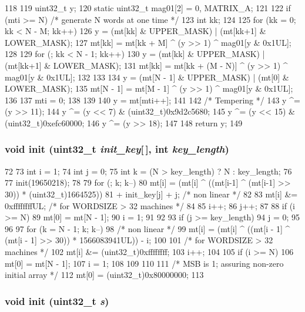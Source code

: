 \begin{DoxyCode}
118 {
119     uint32_t y;
120     static uint32_t mag01[2] = { 0, MATRIX_A};
121 
122     if (mti >= N) { /* generate N words at one time */
123         int kk;
124 
125         for (kk = 0; kk < N - M; kk++) {
126             y = (mt[kk] & UPPER_MASK) | (mt[kk+1] & LOWER_MASK);
127             mt[kk] = mt[kk + M] ^ (y >> 1) ^ mag01[y & 0x1UL];
128         }
129         for (; kk < N - 1; kk++) {
130             y = (mt[kk] & UPPER_MASK) | (mt[kk+1] & LOWER_MASK);
131             mt[kk] = mt[kk + (M - N)] ^ (y >> 1) ^ mag01[y & 0x1UL];
132         }
133 
134         y = (mt[N - 1] & UPPER_MASK) | (mt[0] & LOWER_MASK);
135         mt[N - 1] = mt[M - 1] ^ (y >> 1) ^ mag01[y & 0x1UL];
136 
137         mti = 0;
138     }
139 
140     y = mt[mti++];
141 
142     /* Tempering */
143     y ^= (y >> 11);
144     y ^= (y << 7) & (uint32_t)0x9d2c5680;
145     y ^= (y << 15) & (uint32_t)0xefc60000;
146     y ^= (y >> 18);
147 
148     return y;
149 }
\end{DoxyCode}
\hypertarget{classRandom_ac0f9504f9735c6930e6e229d0c1cb68d}{
\subsubsection[{init}]{\setlength{\rightskip}{0pt plus 5cm}void init ({\bf uint32\_\-t} {\em init\_\-key}\mbox{[}$\,$\mbox{]}, \/  int {\em key\_\-length})}}
\label{classRandom_ac0f9504f9735c6930e6e229d0c1cb68d}



\begin{DoxyCode}
72 {
73     int i = 1;
74     int j = 0;
75     int k = (N > key_length) ? N : key_length;
76 
77     init(19650218);
78 
79     for (; k; k--) {
80         mt[i] = (mt[i] ^ ((mt[i-1] ^ (mt[i-1] >> 30)) * (uint32_t)1664525))
81           + init_key[j] + j; /* non linear */
82 
83         mt[i] &= 0xffffffffUL; /* for WORDSIZE > 32 machines */
84 
85         i++;
86         j++;
87 
88         if (i >= N) {
89             mt[0] = mt[N - 1];
90             i = 1;
91         }
92 
93         if (j >= key_length)
94             j = 0;
95     }
96 
97     for (k = N - 1; k; k--) {
98         /* non linear */
99         mt[i] = (mt[i] ^ ((mt[i - 1] ^ (mt[i - 1] >> 30)) * 1566083941UL)) - i;
100 
101         /* for WORDSIZE > 32 machines */
102         mt[i] &= (uint32_t)0xffffffff;
103         i++;
104 
105         if (i >= N) {
106             mt[0] = mt[N - 1];
107             i = 1;
108         }
109     }
110 
111     /* MSB is 1; assuring non-zero initial array */
112     mt[0] = (uint32_t)0x80000000;
113 }
\end{DoxyCode}
\hypertarget{classRandom_a6ca2c6a95080f7fb866914d4bf303e9f}{
\subsubsection[{init}]{\setlength{\rightskip}{0pt plus 5cm}void init ({\bf uint32\_\-t} {\em s})}}
\label{classRandom_a6ca2c6a95080f7fb866914d4bf303e9f}




